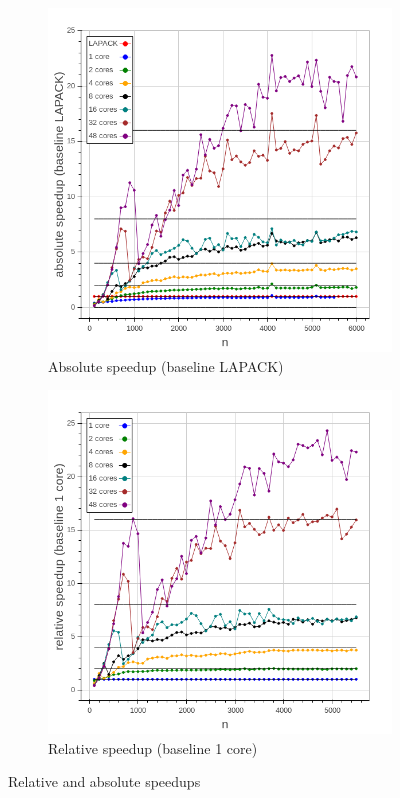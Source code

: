 \documentclass[a4paper,final,ngerman,english]{article}
\begin{document}
\begin{figure}[h!]
	\centering
	\begin{subfigure}{0.46\textwidth}
	\includegraphics[width=\textwidth]{abs_speedup}
	\caption{Absolute speedup (baseline LAPACK)}
\label{fig:rel}
	\end{subfigure}
	\begin{subfigure}{0.46\textwidth}
	\includegraphics[width=\textwidth]{rel_speedup}
	\caption{Relative speedup (baseline 1 core)}
\label{fig:abs}
	\end{subfigure}
	\caption{Relative and absolute speedups}
\end{figure}
\end{document}
